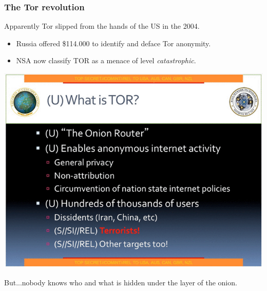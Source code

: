 \begin{frame}
	\frametitle{The Tor revolution}
	Apparently Tor slipped from the hands of the US in the 2004.
	\begin{minipage}{.49\textwidth}

	\begin{itemize}
		\item Russia offered \$114.000 to identify and deface Tor
		anonymity.
		\item NSA now classify TOR as a menace of level
		\textit{catastrophic}.
	\end{itemize}
	\end{minipage}
	\begin{minipage}{.5\textwidth}
		\includegraphics[scale=0.35]{imgs/nsa_tor}
	\end{minipage}
	But...nobody knows who and what is hidden under the layer of the onion.
\end{frame}
